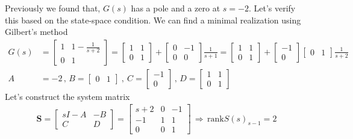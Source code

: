 \documentclass[twoside]{article}
\begin{document}
Previously we found that, $G(s)$ has a pole and a zero at $s = -2$. Let's verify this based on the
state-space condition. We can find a minimal realization using Gilbert's method 
\begin{align*}
     G(s) &= \left[ \begin{array}{cc} 1 & 1 - \frac{1}{s+2}  \\  
	0 & 1  \end{array} \right]
	= \left[ \begin{array}{cc} 1 & 1   \\  
	0 & 1  \end{array} \right] +  \left[ \begin{array}{cc} 0 & -1 \\  
	0 & 0  \end{array} \right] \frac{1}{s+1}
	= \left[ \begin{array}{cc} 1 & 1   \\  
	0 & 1  \end{array} \right] +  \left[ \begin{array}{c} -1 \\ 0 \end{array} \right]   
       \left[ \begin{array}{cc} 0 & 1 \end{array} \right]    \frac{1}{s+2}
       \\
       A &= -2 \, , \, B = \left[ \begin{array}{cc} 0 & 1 \end{array} \right] \ , \ C = \left[ \begin{array}{c} -1 \\ 0 \end{array} \right]
       \, , \, D = \left[ \begin{array}{cc} 1 & 1   \\  
	0 & 1  \end{array} \right]
\end{align*}
%
Let's construct the system matrix 
%
\begin{align*}
\mathbf{S} = \left[ \begin{array}{cc} s I - A & -B \\ C & D \end{array} \right]
= \left[ \begin{array}{ccc} s + 2 & 0 & - 1 \\ -1 & 1 & 1 \\ 0 & 0 & 1 \end{array} \right]
\, \Rightarrow \, \mathrm{rank}S(s)_{s-1} = 2 
\end{align*}
\end{document}

